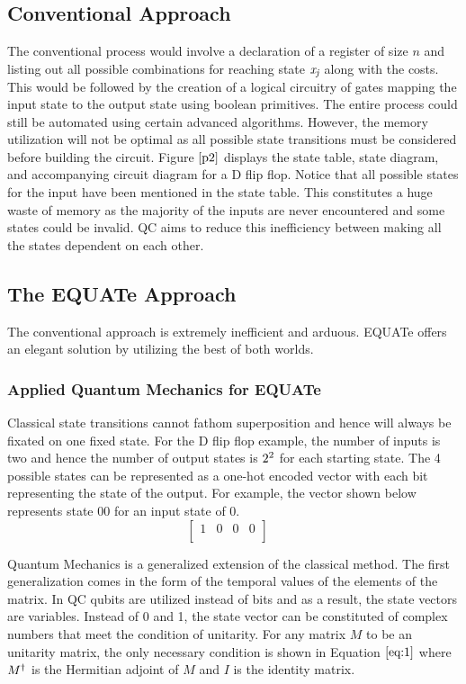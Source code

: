\documentclass[conference]{IEEEtran}
\begin{document}
\subsection{Conventional Approach}
The conventional process would involve a declaration of a register of size $\textit{n}$ and listing out all possible combinations for reaching state $\textit{x\textsubscript{j}}$ along with the costs. This would be followed by the creation of a logical circuitry of gates mapping the input state to the output state using boolean primitives. The entire process could still be automated using certain advanced algorithms. However, the memory utilization will not be optimal as all possible state transitions must be considered before building the circuit. Figure $\ref{p2}$ displays the state table, state diagram, and accompanying circuit diagram for a D flip flop. Notice that all possible states for the input have been mentioned in the state table. This constitutes a huge waste of memory as the majority of the inputs are never encountered and some states could be invalid. QC aims to reduce this inefficiency between making all the states dependent on each other.

\subsection{The EQUATe Approach}

The conventional approach is extremely inefficient and arduous. EQUATe offers an elegant solution by utilizing the best of both worlds. 

\subsubsection{Applied Quantum Mechanics for EQUATe}
Classical state transitions cannot fathom superposition and hence will always be fixated on one fixed state. For the D flip flop example, the number of inputs is two and hence the number of output states is $2\textsuperscript{2}$ for each starting state. The 4 possible states can be represented as a one-hot encoded vector with each bit representing the state of the output. For example, the vector shown below represents state 00 for an input state of 0.
$$
\begin{bmatrix} 
1&0&0&0\\
\end{bmatrix}
\quad
$$

Quantum Mechanics is a generalized extension of the classical method. The first generalization comes in the form of the temporal values of the elements of the matrix. In QC qubits are utilized instead of bits and as a result, the state vectors are variables. Instead of 0 and 1, the state vector can be constituted of complex numbers that meet the condition of unitarity. For any matrix $\textit{M}$ to be an unitarity matrix, the only necessary condition is shown in Equation $\ref{eq:1}$ where $M\textsuperscript{$\dagger$}$ is the Hermitian adjoint of $\textit{M}$ and $\textit{I}$ is the identity matrix. 
\end{document}
